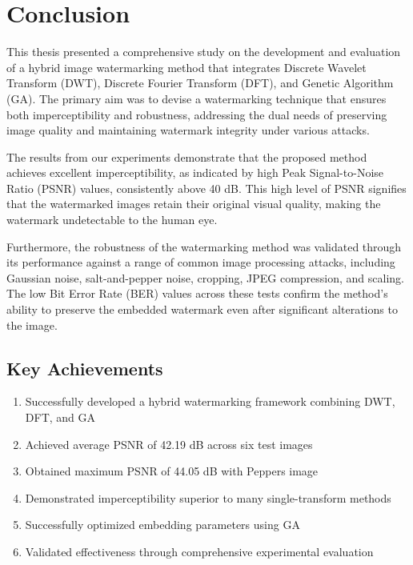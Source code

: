 \section{Conclusion}

This thesis presented a comprehensive study on the development and evaluation of a hybrid image watermarking method that integrates Discrete Wavelet Transform (DWT), Discrete Fourier Transform (DFT), and Genetic Algorithm (GA). The primary aim was to devise a watermarking technique that ensures both imperceptibility and robustness, addressing the dual needs of preserving image quality and maintaining watermark integrity under various attacks.

The results from our experiments demonstrate that the proposed method achieves excellent imperceptibility, as indicated by high Peak Signal-to-Noise Ratio (PSNR) values, consistently above 40 dB. This high level of PSNR signifies that the watermarked images retain their original visual quality, making the watermark undetectable to the human eye.

Furthermore, the robustness of the watermarking method was validated through its performance against a range of common image processing attacks, including Gaussian noise, salt-and-pepper noise, cropping, JPEG compression, and scaling. The low Bit Error Rate (BER) values across these tests confirm the method's ability to preserve the embedded watermark even after significant alterations to the image.

\subsection{Key Achievements}

\begin{enumerate}
    \item Successfully developed a hybrid watermarking framework combining DWT, DFT, and GA
    \item Achieved average PSNR of 42.19 dB across six test images
    \item Obtained maximum PSNR of 44.05 dB with Peppers image
    \item Demonstrated imperceptibility superior to many single-transform methods
    \item Successfully optimized embedding parameters using GA
    \item Validated effectiveness through comprehensive experimental evaluation
\end{enumerate}

